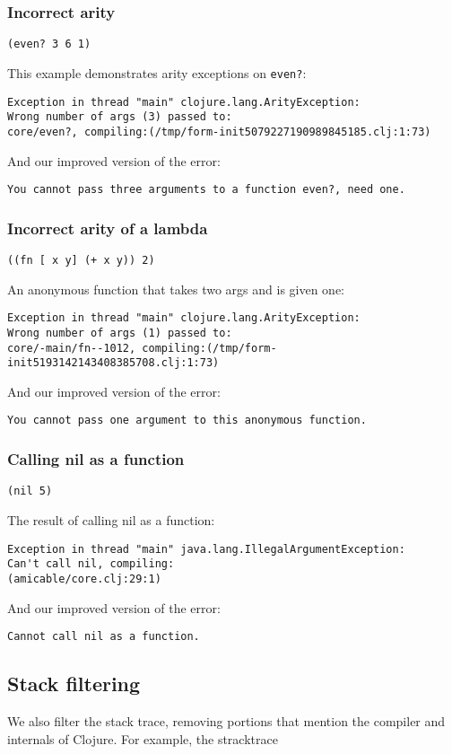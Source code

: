 \documentclass[submission,copyright,creativecommons]{eptcs}
\begin{document}
\subsubsection{Incorrect arity}
{\tt (even? 3 6 1)}

This example demonstrates arity exceptions on \texttt{even?}:
\begin{verbatim}
Exception in thread "main" clojure.lang.ArityException:
Wrong number of args (3) passed to:
core/even?, compiling:(/tmp/form-init5079227190989845185.clj:1:73)
\end{verbatim}
And our improved version of the error:
\begin{verbatim}
You cannot pass three arguments to a function even?, need one.
\end{verbatim}

\subsubsection{Incorrect arity of a lambda}
{\tt ((fn [ x y] (+ x y)) 2)}

An anonymous function that takes two args and is given one:
\begin{verbatim}
Exception in thread "main" clojure.lang.ArityException:
Wrong number of args (1) passed to: 
core/-main/fn--1012, compiling:(/tmp/form-init5193142143408385708.clj:1:73)
\end{verbatim}
And our improved version of the error:
\begin{verbatim}
You cannot pass one argument to this anonymous function.
\end{verbatim}

\subsubsection{Calling nil as a function}
{\tt (nil 5)}

The result of calling nil as a function:
\begin{verbatim}
Exception in thread "main" java.lang.IllegalArgumentException:
Can't call nil, compiling:
(amicable/core.clj:29:1)
\end{verbatim}
And our improved version of the error:
\begin{verbatim}
Cannot call nil as a function.
\end{verbatim}

\subsection{Stack filtering}
We also filter the stack trace, removing portions that mention the compiler and internals of Clojure. For example, the stracktrace 
\end{document}
